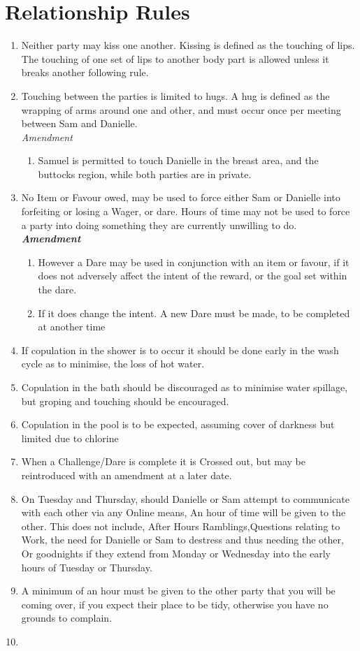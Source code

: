 
 \section{Relationship Rules} \label{porn}
\begin{enumerate}
  \item Neither party may kiss one another. Kissing is defined as the touching of lips. The touching of one set of lips to another
   body part is allowed unless it breaks another following rule.
  \item Touching between the parties is limited to hugs. A hug is defined as the wrapping of arms around one and other, and
   must occur once per meeting between Sam and Danielle.
   \\\emph{Amendment}
  \begin{enumerate}
    \item Samuel is permitted to touch Danielle in the breast area, and the buttocks region, while both parties are in private. 
  \end{enumerate}
  \item  No Item or Favour owed, may be used to force either Sam or Danielle into forfeiting or losing a Wager, or dare. 
  Hours of time may not be used to force a party into doing something they are currently unwilling to do. 
  \\ \textbf{\emph{Amendment}}
  \begin{enumerate}
    \item However a Dare may be used in conjunction with an item or favour, if it does not adversely affect the intent 
    of the reward, or the goal set within the dare.
    \item  If it does change the intent. A new Dare must be made, to be completed at another time
  \end{enumerate}
  \item If copulation in the shower is to occur it should be done early in the wash cycle as to minimise, the loss of hot water.
  \item Copulation in the bath should be discouraged as to minimise water spillage, but groping and touching should be encouraged.
  \item Copulation in the pool is to be expected, assuming cover of darkness but limited due to chlorine
  \item When a Challenge/Dare is complete it is Crossed out, but may be reintroduced with an amendment at a later date.
  \item On Tuesday and Thursday, should Danielle or Sam attempt to communicate with each other via any Online means, 
  An hour of time will be given to the other. This does not include, After Hours Ramblings,Questions relating to Work, 
  the need for Danielle or Sam to destress and thus needing the other, Or goodnights if they extend from Monday or Wednesday 
  into the early hours of Tuesday or Thursday.
  \item A minimum of an hour must be given to the other party that you will be coming over, if you expect their place to be tidy,
  otherwise you have no grounds to complain.
  \item 
\end{enumerate}
 




 

 

 